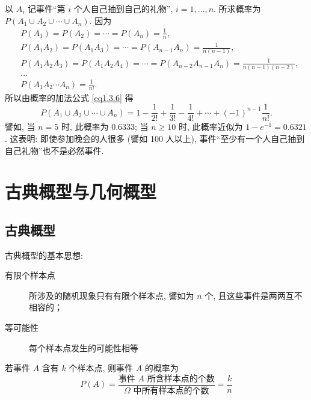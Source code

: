 \begin{solution}
    以 $A_i$ 记事件“第 $i$ 个人自己抽到自己的礼物”,
    $i=1,\dotsc,n$.
    所求概率为 $P(A_1 \cup A_2 \cup \dotsb \cup A_n)$.
    因为
    \begin{align*}
         & P(A_1) = P(A_2) = \dotsb = P(A_n) =\frac{1}{n},                                              \\
         & P(A_1 A_2) = P(A_1 A_3) = \dotsb = P(A_{n-1} A_n) = \frac{1}{n (n-1)},                       \\
         & P(A_1 A_2 A_3) = P(A_1 A_2 A_4) = \dotsb = P(A_{n-2} A_{n-1} A_n) = \frac{1}{n (n-1) (n-2)}, \\
         & \ldots                                                                                       \\
         & P(A_1 A_2 \dotsb A_n) = \frac{1}{n!}.
    \end{align*}
    所以由概率的加法公式 \eqref{eq1.3.6} 得
    \[
        P(A_1 \cup A_2 \cup \dotsb \cup A_n) = 1 - \frac{1}{2!} + \frac{1}{3!} - \frac{1}{4!} + \dotsb + (-1)^{n-1} \frac{1}{n!}.
    \]
    譬如,
    当 $n=5$ 时,
    此概率为 \num{0.6333};
    当 $n \ge 10$ 时,
    此概率近似为 $1 - e^{-1} = 0.6321$.
    这表明:
    即使参加晚会的人很多 (譬如 100 人以上),
    事件“至少有一个人自己抽到自己礼物”也不是必然事件.
\end{solution}

\section{古典概型与几何概型}

\subsection{古典概型}

古典概型的基本思想:
\begin{description}
    \item[有限个样本点] 所涉及的随机现象只有有限个样本点, 譬如为 $n$ 个, 且这些事件是两两互不相容的；
    \item[等可能性] 每个样本点发生的可能性相等
\end{description}

\begin{definition}
    若事件 $A$ 含有 $k$ 个样本点, 则事件 $A$ 的概率为
    \[  P (A) = \frac{\text{事件 } A \text{ 所含样本点的个数}}{\Omega \text{ 中所有样本点的个数}} = \frac{k}{n} \]
\end{definition}


